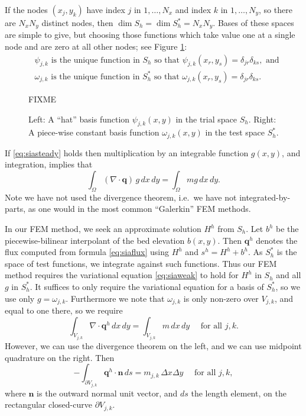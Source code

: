 \documentclass[11pt]{amsart}
\newcommand\bn{\mathbf{n}}
\newcommand\bq{\mathbf{q}}
\newcommand{\Div}{\nabla\cdot}
\begin{document}
If the nodes $(x_j,y_k)$ have index $j$ in $1,\dots,N_x$ and index $k$ in $1,\dots,N_y$, so there are $N_xN_y$ distinct nodes, then $\dim S_h = \dim S_h^* = N_x N_y$.  Bases of these spaces are simple to give, but choosing those functions which take value one at a single node and are zero at all other nodes; see Figure \ref{fig:fembases}:
\begin{align}
&\psi_{j,k} \text{ is the unique function in } S_h \text{ so that } \psi_{j,k}(x_r,y_s) = \delta_{jr} \delta_{ks}, \text{ and} \\
&\omega_{j,k} \text{ is the unique function in } S_h^* \text{ so that } \omega_{j,k}(x_r,y_s) = \delta_{jr} \delta_{ks}.
\end{align}

\begin{figure}[ht]
\begin{center}
FIXME
\end{center}
\caption{Left: A ``hat'' basis function $\psi_{j,k}(x,y)$ in the trial space $S_h$.  Right: A piece-wise constant basis function $\omega_{j,k}(x,y)$ in the test space $S_h^*$.}
\label{fig:fembases}
\end{figure}

If \eqref{eq:siasteady} holds then multiplication by an integrable function $g(x,y)$, and integration, implies that
\begin{equation}
  \int_\Omega (\Div \bq)\, g\,dx\,dy = \int_\Omega m g\,dx\,dy.  \label{eq:siaweak}
\end{equation}
Note we have not used the divergence theorem, i.e.~we have not integrated-by-parts, as one would in the most common ``Galerkin'' FEM methods.

In our FEM method, we seek an approximate solution $H^h$ from $S_h$.  Let $b^h$ be the piecewise-bilinear interpolant of the bed elevation $b(x,y)$.  Then $\bq^h$ denotes the flux computed from formula \eqref{eq:siaflux} using $H^h$ and $s^h=H^h+b^h$.  As $S_h^*$ is the space of test functions, we integrate against such functions.  Thus our FEM method requires the variational equation \eqref{eq:siaweak} to hold for $H^h$ in $S_h$ and all $g$ in $S_h^*$.  It suffices to only require the variational equation for a basis of $S_h^*$, so we use only $g=\omega_{j,k}$.  Furthermore we note that $\omega_{j,k}$ is only non-zero over $V_{j,k}$, and equal to one there, so we require
\begin{equation}
  \int_{V_{j,k}} \Div \bq^h \,dx\,dy = \int_{V_{j,k}} m \,dx\,dy \quad \text{ for all } j,k.  \label{eq:siapgfirst}
\end{equation}
However, we can use the divergence theorem on the left, and we can use midpoint quadrature \cite{Elmanetal2005} on the right.  Then
\begin{equation}
  - \int_{\partial V_{j,k}} \bq^h \cdot \bn\,ds = m_{j,k}\, \Delta x \Delta y \quad \text{ for all } j,k, \label{eq:siapg}
\end{equation}
where $\bn$ is the outward normal unit vector, and $ds$ the length element, on the rectangular closed-curve $\partial V_{j,k}$.
\end{document}
